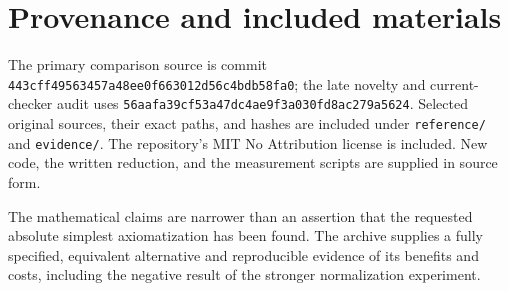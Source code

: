 \documentclass[11pt,letterpaper]{article}
\newcommand{\file}[1]{\nolinkurl{#1}}
\begin{document}
\section*{Provenance and included materials}

The primary comparison source is commit
\texttt{443cff49563457a48ee0f663012d56c4bdb58fa0}; the late novelty and
current-checker audit uses
\texttt{56aafa39cf53a47dc4ae9f3a030fd8ac279a5624}.
Selected original sources, their exact paths, and hashes are included
under \file{reference/} and \file{evidence/}. The repository's MIT No
Attribution license is included. New code, the written reduction, and
the measurement scripts are supplied in source form.

The mathematical claims are narrower than an assertion that the requested
absolute simplest axiomatization has been found. The archive supplies a
fully specified, equivalent alternative and reproducible evidence of its
benefits and costs, including the negative result of the stronger
normalization experiment.
\end{document}

